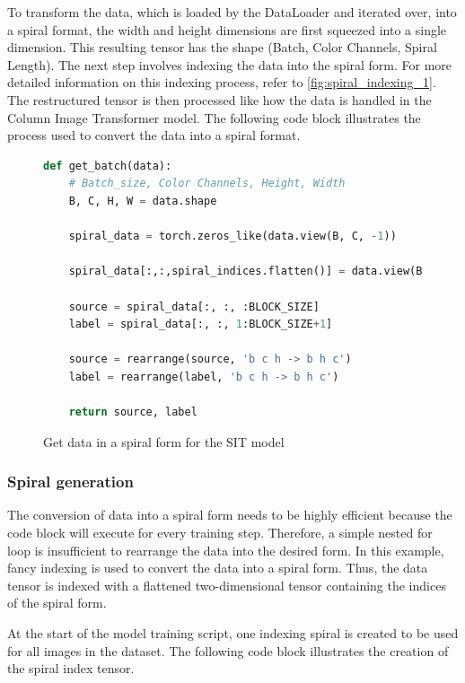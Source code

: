     To transform the data, which is loaded by the DataLoader and iterated over, into a spiral format, the width and height dimensions are first squeezed into a single dimension. This resulting tensor has the shape (Batch, Color Channels, Spiral Length). The next step involves indexing the data into the spiral form. For more detailed information on this indexing process, refer to \autoref{fig:spiral_indexing_1}. The restructured tensor is then processed like how the data is handled in the Column Image Transformer model. The following code block illustrates the process used to convert the data into a spiral format.

    \begin{figure}[H]
        \centering
        \begin{lstlisting}[language=Python]
def get_batch(data):
    # Batch_size, Color Channels, Height, Width
    B, C, H, W = data.shape

    spiral_data = torch.zeros_like(data.view(B, C, -1))

    spiral_data[:,:,spiral_indices.flatten()] = data.view(B, C, -1)

    source = spiral_data[:, :, :BLOCK_SIZE]
    label = spiral_data[:, :, 1:BLOCK_SIZE+1]

    source = rearrange(source, 'b c h -> b h c')
    label = rearrange(label, 'b c h -> b h c')

    return source, label
        \end{lstlisting}
        \caption{Get data in a spiral form for the SIT model}
        \label{fig:spiral_indexing_code}
    \end{figure}

    \subsubsection{Spiral generation}
    \label{sec:spiral_generation}
    The conversion of data into a spiral form needs to be highly efficient because the code block will execute for every training step. Therefore, a simple nested for loop is insufficient to rearrange the data into the desired form. In this example, fancy indexing is used to convert the data into a spiral form. Thus, the data tensor is indexed with a flattened two-dimensional tensor containing the indices of the spiral form.

    At the start of the model training script, one indexing spiral is created to be used for all images in the dataset. The following code block illustrates the creation of the spiral index tensor.

